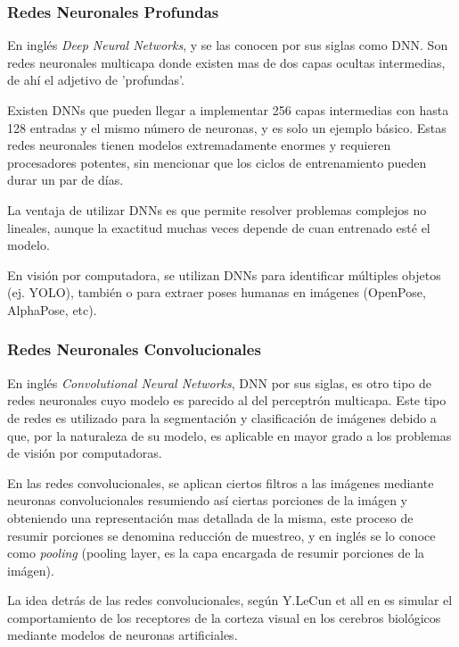 \documentclass[a4paper,12pt,oneside,spanish]{book}
\begin{document}
\subsubsection{Redes Neuronales Profundas}
En inglés \textit{Deep Neural Networks}, y se las conocen por sus siglas como DNN. Son redes neuronales multicapa donde existen mas de dos capas ocultas intermedias, de ahí el adjetivo de 'profundas'.\par

Existen DNNs que pueden llegar a implementar 256 capas intermedias con hasta 128 entradas y el mismo número de neuronas, y es solo un ejemplo básico. Estas redes neuronales tienen modelos extremadamente enormes y requieren procesadores potentes, sin mencionar que los ciclos de entrenamiento pueden durar un par de días.\par

La ventaja de utilizar DNNs es que permite resolver problemas complejos no lineales, aunque la exactitud muchas veces depende de cuan entrenado esté el modelo.\par

En visión por computadora, se utilizan DNNs para identificar múltiples objetos (ej. YOLO), también o para extraer poses humanas en imágenes (OpenPose, AlphaPose, etc).\par

\subsubsection{Redes Neuronales Convolucionales}
En inglés \textit{Convolutional Neural Networks}, DNN por sus siglas, es otro tipo de redes neuronales cuyo modelo es parecido al del perceptrón multicapa. Este tipo de redes es utilizado para la segmentación y clasificación de imágenes debido a que, por la naturaleza de su modelo, es aplicable en mayor grado a los problemas de visión por computadoras.\par

En las redes convolucionales, se aplican ciertos filtros a las imágenes mediante neuronas convolucionales resumiendo así ciertas porciones de la imágen y obteniendo una representación mas detallada de la misma, este proceso de resumir porciones se denomina reducción de muestreo, y en inglés se lo conoce como \textit{pooling} (pooling layer, es la capa encargada de resumir porciones de la imágen). \par

La idea detrás de las redes convolucionales, según Y.LeCun et all en \cite{convolutional1} es simular el comportamiento de los receptores de la corteza visual en los cerebros biológicos mediante modelos de neuronas artificiales. \par
\end{document}
